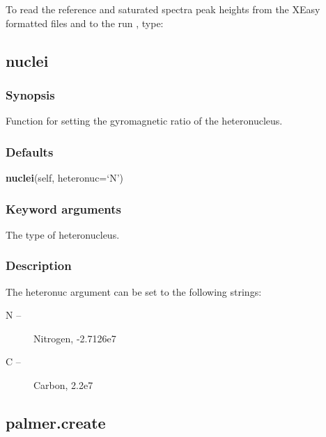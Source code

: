 To read  the reference and saturated spectra peak heights from the XEasy formatted files
 and 
 to the run 
, type:





\newpage

\subsection{nuclei}


\subsubsection{Synopsis}

Function for setting the gyromagnetic ratio of the heteronucleus.

\subsubsection{Defaults}

\textsf{\textbf{nuclei}(self, heteronuc=`N')}


\subsubsection{Keyword arguments}


  The type of heteronucleus.

\subsubsection{Description}

The heteronuc argument can be set to the following strings:

\begin{description}
\item[    N --]   Nitrogen, -2.7126e7
\item[    C --]   Carbon, 2.2e7
\end{description}


\newpage

\subsection{palmer.create}


